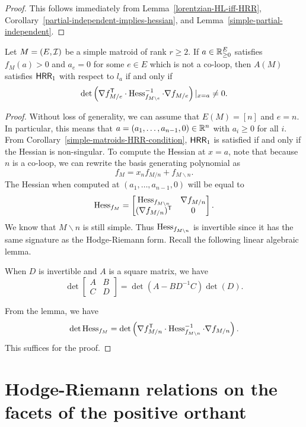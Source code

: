 \documentclass{puthesis-UG}
\begin{document}
\begin{proof}
	This follows immediately from Lemma~\ref{lorentzian-HL-iff-HRR}, Corollary~\ref{partial-independent-implies-hessian}, and Lemma~\ref{simple-partial-independent}.
\end{proof}

\begin{thm}
	Let $M = (E, \mathcal{I})$ be a simple matroid of rank $r \geq 2$. If $a \in \mathbb{R}_{\geq 0}^E$ satisfies $f_M(a) > 0$ and $a_e = 0$ for some $e \in E$ which is not a co-loop, then $A(M)$ satisfies $\mathsf{HRR}_1$ with respect to $l_a$ if and only if 
	\[
		\det \left ( \nabla f_{M / e}^{\mathsf{T}} \cdot \operatorname{Hess}^{-1}_{f_{M \backslash e}} \cdot \nabla f_{M / e} \right ) |_{x = a} \neq 0.
	\]
\end{thm}

\begin{proof}
	Without loss of generality, we can assume that $E(M) = [n]$ and $e = n$. In particular, this means that $a = (a_1, \ldots, a_{n-1}, 0) \in \mathbb{R}^n$ with $a_i \geq 0$ for all $i$. From Corollary~\ref{simple-matroids-HRR-condition}, $\mathsf{HRR}_1$ is satisfied if and only if the Hessian is non-singular. To compute the Hessian at $x = a$, note that because $n$ is a co-loop, we can rewrite the basis generating polynomial as 
	\[
		f_M = x_n f_{M / n} + f_{M \backslash n}.
	\]
	The Hessian when computed at $(a_1, \ldots, a_{n-1}, 0)$ will be equal to 
	\[
		\operatorname{Hess}_{f_M} = \begin{bmatrix}
			\operatorname{Hess}_{f_{M \backslash n}} & \nabla f_{M/n} \\
			(\nabla f_{M/n})^{\mathsf{T}} & 0
		\end{bmatrix}.
	\]
	We know that $M \backslash n$ is still simple. Thus $\operatorname{Hess}_{f_{M \backslash n}}$ is invertible since it has the same signature as the Hodge-Riemann form. Recall the following linear algebraic lemma. 
	\begin{lem}
		When $D$ is invertible and $A$ is a square matrix, we have
		\[
			\det \begin{bmatrix} A & B \\ C & D \end{bmatrix} = \det (A - B D^{-1} C) \det (D).
		\]
	\end{lem}
	From the lemma, we have 
	\[
		\det \operatorname{Hess}_{f_M} = \det \left ( \nabla f_{M / n}^{\mathsf{T}} \cdot \operatorname{Hess}^{-1}_{f_{M \backslash n}} \cdot \nabla f_{M / n} \right ).
	\]
	This suffices for the proof. 
\end{proof}
\section{Hodge-Riemann relations on the facets of the positive orthant}
\end{document}
